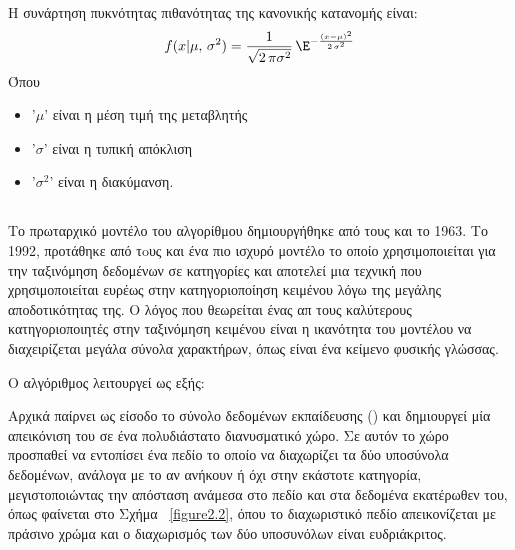 \begin{frame}{}
        \hspace{0.5cm} Η συνάρτηση πυκνότητας πιθανότητας της κανονικής κατανομής είναι:
        \begin{equation}
        f(x | \mu,\,\sigma^{2})=\frac{1}{\sqrt{2\,\pi \sigma^{2}}}\,\E^{-\frac{\left(x-\mu\right)^2}{2\,\sigma^2} }
        \end{equation}
        Όπου
        \begin{itemize}
            \item '${\mu}$' είναι η μέση τιμή της μεταβλητής
            \item '${\sigma}$' είναι η τυπική απόκλιση
            \item '${\sigma^2}$' είναι η διακύμανση. 
        \end{itemize}
\end{frame}


\subsection{}

Το πρωταρχικό μοντέλο του αλγορίθμου  δημιουργήθηκε από τους  και  το 1963. Το 1992, προτάθηκε από τoυς  και  ένα πιο ισχυρό μοντέλο το οποίο χρησιμοποιείται για την ταξινόμηση δεδομένων σε κατηγορίες και αποτελεί μια τεχνική που χρησιμοποιείται ευρέως στην κατηγοριοποίηση κειμένου λόγω της μεγάλης αποδοτικότητας της. Ο λόγος που θεωρείται ένας απ τους καλύτερους κατηγοριοποιητές στην ταξινόμηση κειμένου είναι η ικανότητα του μοντέλου να διαχειρίζεται μεγάλα σύνολα χαρακτήρων, όπως είναι ένα κείμενο φυσικής γλώσσας.

Ο αλγόριθμος λειτουργεί ως εξής:

Αρχικά παίρνει ως είσοδο το σύνολο δεδομένων εκπαίδευσης () και δημιουργεί μία απεικόνιση του σε ένα πολυδιάστατο διανυσματικό χώρο. Σε αυτόν το χώρο προσπαθεί να εντοπίσει ένα πεδίο το οποίο να διαχωρίζει τα δύο υποσύνολα δεδομένων, ανάλογα με το αν ανήκουν ή όχι στην εκάστοτε κατηγορία, μεγιστοποιώντας την απόσταση ανάμεσα στο πεδίο και στα δεδομένα εκατέρωθεν του, όπως φαίνεται στο Σχήμα ~\ref{figure2.2}, όπου το διαχωριστικό πεδίο απεικονίζεται με πράσινο χρώμα και ο διαχωρισμός των δύο υποσυνόλων είναι ευδριάκριτος.

